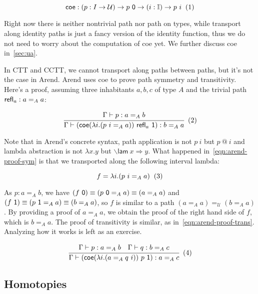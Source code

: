 \[
  \textsf{coe} : (p : I \rightarrow \mathcal U)
  \rightarrow p \ \textsf 0
  \rightarrow (i : \mathbb I) \rightarrow p \ i
  \xtag
\]

Right now there is neither nontrivial path nor path on types,
while transport along identity paths is just a fancy version
of the identity function, thus we do not need to worry about the
computation of \textsf{coe} yet.
We further discuss \textsf{coe} in~\cref{sec:ua}.

In CTT and CCTT, we cannot transport along paths between paths,
but it's not the case in Arend.
Arend uses \textsf{coe} to prove path symmetry and transitivity.
Here's a proof, assuming three inhabitants $a, b, c$ of type $A$
and the trivial path $\textsf{refl}_a : a =_A a$:

\[
  \cfrac{
    \Gamma \vdash p : a =_A b
  }{
    \Gamma \vdash (\textsf{coe}
    (\lambda i. (p\ i =_A a)) \ \refl_a \ \textsf 1)
    : b =_A a
  }
  \xtag \label{eqn:arend-proof-sym}
\]

Note that in Arend's concrete syntax, path application is not
$p\ i$ but $p\ @\ i$ and lambda abstraction is not $\lambda x.y$ but
$\backslash{}\textsf{lam} \ x \Rightarrow y$.
What happened in~\ref{eqn:arend-proof-sym} is that we transported
along the following interval lambda:

\[
  f = \lambda i. (p\ i =_A a)
  \xtag
\]

As $p : a =_A b$, we have
$(f \ \textsf 0) \equiv (p \ \textsf 0 =_A a) \equiv (a =_A a)$ and
$(f \ \textsf 1) \equiv (p \ \textsf 1 =_A a) \equiv (b =_A a)$,
so $f$ is similar to a path $(a =_A a) =_{\mathcal U} (b =_A a)$.
By providing a proof  of $a =_A a$,
we obtain the proof of the right hand side of $f$, which is $b =_A a$.
The proof of transitivity is similar, as in~\ref{eqn:arend-proof-trans}.
Analyzing how it works is left as an exercise.

\[
  \cfrac{
    \Gamma \vdash p : a =_A b
    \quad
    \Gamma \vdash q : b =_A c
  }{
    \Gamma \vdash (\textsf{coe}
    (\lambda i. (a =_A q\ i)) \ p \ \textsf 1)
    : a =_A c
  }
  \xtag \label{eqn:arend-proof-trans}
\]

\subsection{Homotopies}
\label{subsec:hom}

\TODO
